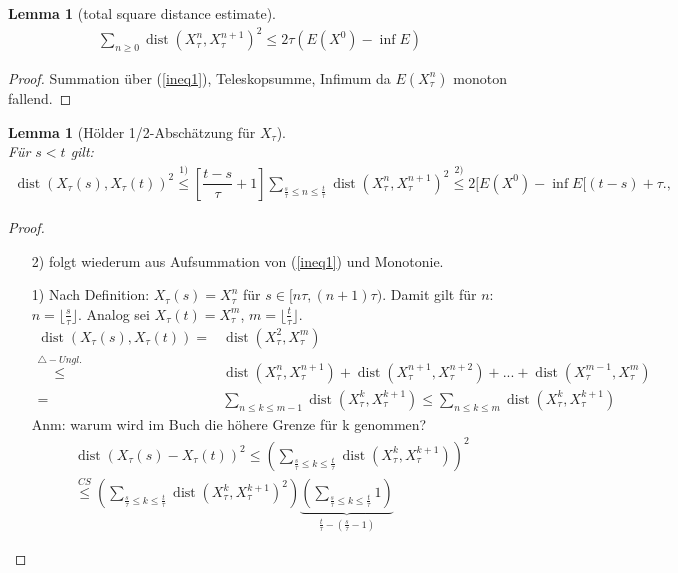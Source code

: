 \documentclass[11pt,a4paper,notitlepage]{scrreprt}
\newcommand{\dist}{\operatorname{dist}}
\newtheorem{lem}[defi]{Lemma}
\begin{document}
\begin{lem}[total square distance estimate]
\begin{eqnarray}
\sum_{n\geq 0}\dist(X_\tau^n,X_\tau^{n+1})^2\leq 2\tau (E(X^0)-\inf E)\label{totalsquare}
\end{eqnarray}
\end{lem}
\begin{proof}
Summation über (\ref{ineq1}), Teleskopsumme, Infimum da $E(X_\tau^n)$ monoton fallend.
\end{proof}

\begin{lem}[Hölder 1/2-Abschätzung für $X_\tau$]  $~~$ \\
Für $s<t$ gilt:
\begin{eqnarray}
\dist(X_\tau(s),X_\tau(t))^2 \overset{1)}\leq \left[\dfrac{t-s}{\tau}+1\right] \sum_{\frac{s}{\tau}\leq n \leq \frac{t}{\tau}} \dist (X^n_\tau, X_\tau^{n+1})^2 \overset{2)}\leq 2[E(X^0)-\inf E[(t-s)+\tau., \label{Hölder}
\end{eqnarray}
\end{lem}

\begin{proof}
\begin{itemize}
\item[2)] folgt wiederum aus Aufsummation von (\ref{ineq1}) und Monotonie.
\item[1)] Nach Definition: $X_\tau(s)=X_\tau^n$ für $s\in [n\tau,(n+1)\tau)$. Damit gilt für $n$: $n=\lfloor \frac{s}{	\tau}\rfloor$. Analog sei $X_\tau(t)=X_\tau^m$, $m=\lfloor\frac{t}{\tau}\rfloor$.\\
\begin{align*}
\dist(X_\tau(s),X_\tau(t))=&\dist(X_\tau^2,X_\tau^m)\\\overset{\triangle -Ungl.}\leq&\dist(X_\tau^n,X_\tau^{n+1})+\dist(X_\tau^{n+1},X_\tau^{n+2})+...+\dist(X_\tau^{m-1},X_\tau^m)\\
=&\sum_{n\leq k\leq m-1}\dist(X_\tau^k,X_\tau^{k+1})\leq \sum_{n\leq k\leq m}\dist(X_\tau^k,X_\tau^{k+1})
\end{align*}
Anm: warum wird im Buch die höhere Grenze für k genommen?\\
\begin{align*}
\dist(X_\tau(s)-X_\tau(t))^2\leq\left(\sum_{\frac{s}{\tau}\leq k\leq \frac{t}{\tau}}\dist(X_\tau^k,X_\tau^{k+1})\right)^2 \\ \overset{CS}\leq\left(\sum_{\frac{s}{\tau}\leq k\leq \frac{t}{\tau}}\dist(X_\tau^k,X_\tau^{k+1})^2\right)\underset{\frac{t}{\tau}-(\frac{s}{\tau}-1)}{\underbrace{\left(\sum_{\frac{s}{\tau}\leq k\leq \frac{t}{\tau}}1\right)}}
\end{align*}
\end{itemize}
\end{proof}
\end{document}
